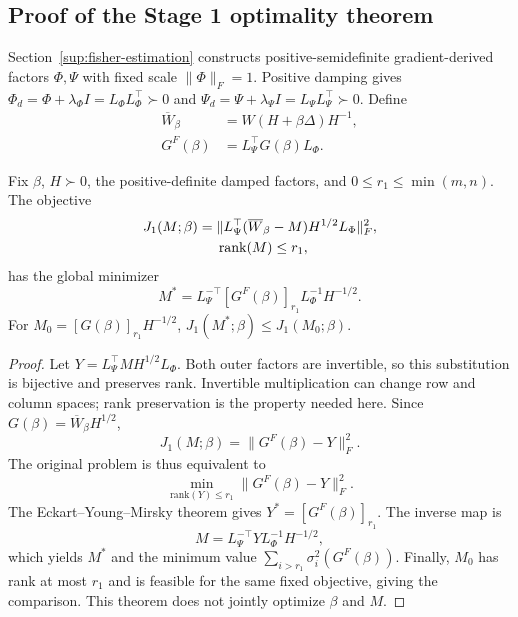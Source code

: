 \subsection{Proof of the Stage 1 optimality theorem}\label{sup:stage1-proof}

Section~\ref{sup:fisher-estimation} constructs positive-semidefinite gradient-derived factors $\Phi,\Psi$ with fixed scale $\|\Phi\|_F=1$. Positive damping gives $\Phi_d=\Phi+\lambda_\Phi I=L_\Phi L_\Phi^\top\succ0$ and $\Psi_d=\Psi+\lambda_\Psi I=L_\Psi L_\Psi^\top\succ0$. Define
\begin{equation}
\begin{aligned}
\overline W_\beta&=W(H+\beta\Delta)H^{-1},\\
G^F(\beta)&=L_\Psi^\top G(\beta)L_\Phi.
\end{aligned}
\end{equation}

\begin{theorem*}
Fix $\beta$, $H\succ0$, the positive-definite damped factors, and $0\le r_1\le\min(m,n)$. The objective
\begin{equation}
\begin{aligned}
J_1(M;\beta)
&=\|L_\Psi^\top(\overline W_\beta-M)H^{1/2}L_\Phi\|_F^2, \\
&\hspace{1.5em}\mathrm{rank}(M)\le r_1,
\end{aligned}
\end{equation}
has the global minimizer
\begin{equation}
M^*=L_\Psi^{-\top}[G^F(\beta)]_{r_1}L_\Phi^{-1}H^{-1/2}.
\end{equation}
For $M_0=[G(\beta)]_{r_1}H^{-1/2}$, $J_1(M^*;\beta)\le J_1(M_0;\beta)$.
\end{theorem*}

\begin{proof}
Let $Y=L_\Psi^\top M H^{1/2}L_\Phi$. Both outer factors are invertible, so this substitution is bijective and preserves rank. Invertible multiplication can change row and column spaces; rank preservation is the property needed here. Since $G(\beta)=\overline W_\beta H^{1/2}$,
\begin{equation}
J_1(M;\beta)=\|G^F(\beta)-Y\|_F^2.
\end{equation}
The original problem is thus equivalent to
\begin{equation}
\min_{\mathrm{rank}(Y)\le r_1}\|G^F(\beta)-Y\|_F^2.
\end{equation}
The Eckart--Young--Mirsky theorem gives $Y^*=[G^F(\beta)]_{r_1}$. The inverse map is
\begin{equation}
M=L_\Psi^{-\top}Y L_\Phi^{-1}H^{-1/2},
\end{equation}
which yields $M^*$ and the minimum value $\sum_{i>r_1}\sigma_i^2(G^F(\beta))$. Finally, $M_0$ has rank at most $r_1$ and is feasible for the same fixed objective, giving the comparison. This theorem does not jointly optimize $\beta$ and $M$.
\end{proof}

